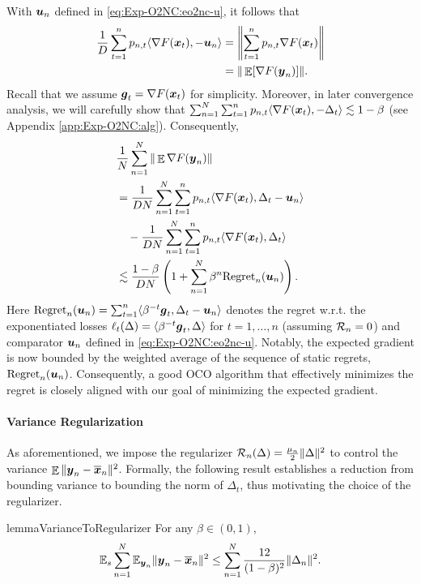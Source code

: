 With ${\boldsymbol{u}}_n$ defined in \eqref{eq:Exp-O2NC:eo2nc-u}, it follows that
\begin{align*}
    \frac{1}{D}\sum_{t=1}^n p_{n,t} \langle \nabla F({\boldsymbol{x}}_t), -{\boldsymbol{u}}_n\rangle 
    &= \left\| \sum_{t=1}^n p_{n,t} \nabla F({\boldsymbol{x}}_t) \right\| \\
    &= \|\mathop{\mathbb{E}} [\nabla F({\boldsymbol{y}}_n)]\|.
\end{align*}
Recall that we assume ${\boldsymbol{g}}_t=\nabla F({\boldsymbol{x}}_t)$ for simplicity. Moreover, in later convergence analysis, we will carefully show that $\sum_{n=1}^N\sum_{t=1}^n p_{n,t} \langle\nabla F({\boldsymbol{x}}_t),-\Delta_t\rangle \lesssim 1-\beta$ (see Appendix \ref{app:Exp-O2NC:alg}). Consequently,
\begin{align*}
    &\frac{1}{N} \sum_{n=1}^N \|\mathop{\mathbb{E}}\nabla F({\boldsymbol{y}}_n)\| \\
    &= \frac{1}{DN} \sum_{n=1}^N \sum_{t=1}^n p_{n,t} \langle \nabla F({\boldsymbol{x}}_t), \Delta_t-{\boldsymbol{u}}_n\rangle \\
    &\quad - \frac{1}{DN} \sum_{n=1}^N \sum_{t=1}^n p_{n,t}\langle \nabla F({\boldsymbol{x}}_t),\Delta_t\rangle \\
    &\lesssim \frac{1-\beta}{DN} \left(1+\sum_{n=1}^N \beta^n 
    \mathrm{Regret}_n({\boldsymbol{u}}_n)\right).
\end{align*}
Here $\mathrm{Regret}_n({\boldsymbol{u}}_n) = \sum_{t=1}^n \langle \beta^{-t}{\boldsymbol{g}}_t,\Delta_t-{\boldsymbol{u}}_n\rangle$ denotes the regret w.r.t. the exponentiated losses $\ell_t(\Delta) = \langle \beta^{-t}{\boldsymbol{g}}_t,\Delta\rangle$ for $t=1,\ldots,n$ (assuming ${\cal R}_n=0$) and comparator ${\boldsymbol{u}}_n$ defined in \eqref{eq:Exp-O2NC:eo2nc-u}. Notably, the expected gradient is now bounded by the weighted average of the sequence of static regrets, $\mathrm{Regret}_n({\boldsymbol{u}}_n)$. Consequently, a good OCO algorithm that effectively minimizes the regret is closely aligned with our goal of minimizing the expected gradient.


\paragraph{Variance Regularization}
As aforementioned, we impose the regularizer ${\cal R}_n(\Delta) = \frac{\mu_n}{2}\|\Delta\|^2$ to control the variance $\mathop{\mathbb{E}}\|{\boldsymbol{y}}_n-\overline{{\boldsymbol{x}}}_n\|^2$. Formally, the following result establishes a reduction from bounding variance to bounding the norm of $\Delta_t$, thus motivating the choice of the regularizer.

\begin{restatable}{lemma}{VarianceToRegularizer}
\label{lem:Exp-O2NC:variance-regularizer}
For any $\beta\in(0,1)$, 
\begin{align*}
    \mathbb{E}_s\sum_{n=1}^N \mathbb{E}_{{\boldsymbol{y}}_n} \|{\boldsymbol{y}}_n-\overline{{\boldsymbol{x}}}_n\|^2 \le \sum_{n=1}^N \frac{12}{(1-\beta)^2}\|\Delta_n\|^2.
\end{align*}
\end{restatable}

